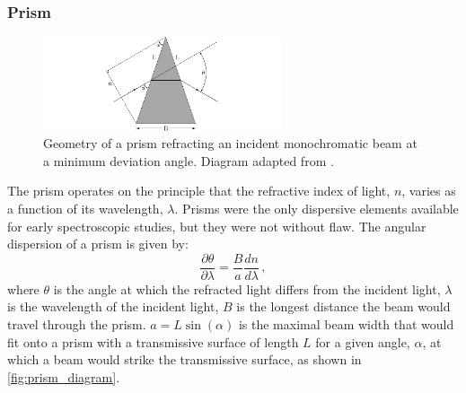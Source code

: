 \subsubsection{Prism} \label{subsubsec:prism}

\begin{figure}[t]
    \centering
    \includegraphics[width = 7cm]{figures/2_prism_diagram.pdf}
    \caption{Geometry of a prism refracting an incident monochromatic beam at a minimum deviation angle. Diagram adapted from \cite{BirneyObsAstro}.}
    \label{fig:prism_diagram}
\end{figure}

The prism operates on the principle that the refractive index of light, $n$, varies as a function of its wavelength, $\lambda$. Prisms were the only dispersive elements available for early spectroscopic studies, but they were not without flaw. The angular dispersion of a prism is given by:
\begin{equation}
    \frac{\partial \theta}{\partial \lambda} = \frac{B}{a}\frac{dn}{d\lambda}\,,\label{eq:prism_angular_dispersion}
\end{equation}
where $\theta$ is the angle at which the refracted light differs from the incident light, $\lambda$ is the wavelength of the incident light, $B$ is the longest distance the beam would travel through the prism. $a = L \sin(\alpha)$ is the maximal beam width that would fit onto a prism with a transmissive surface of length $L$ for a given angle, $\alpha$, at which a beam would strike the transmissive surface, as shown in \autoref{fig:prism_diagram}.

